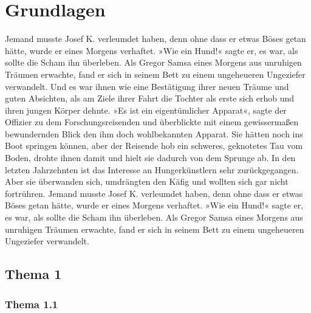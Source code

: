 \chapter{Grundlagen}
\label{chap:grundlagen}

Jemand musste Josef K. verleumdet haben, denn ohne dass er etwas Böses
getan hätte, wurde er eines Morgens verhaftet. »Wie ein Hund!« sagte er,
es war, als sollte die Scham ihn überleben. Als Gregor Samsa eines
Morgens aus unruhigen Träumen erwachte, fand er sich in seinem Bett zu
einem ungeheueren Ungeziefer verwandelt. Und es war ihnen wie eine
Bestätigung ihrer neuen Träume und guten Absichten, als am Ziele ihrer
Fahrt die Tochter als erste sich erhob und ihren jungen Körper dehnte.
»Es ist ein eigentümlicher Apparat«, sagte der Offizier zu dem
Forschungsreisenden und überblickte mit einem gewissermaßen bewundernden
Blick den ihm doch wohlbekannten Apparat. Sie hätten noch ins Boot
springen können, aber der Reisende hob ein schweres, geknotetes Tau vom
Boden, drohte ihnen damit und hielt sie dadurch von dem Sprunge ab. In
den letzten Jahrzehnten ist das Interesse an Hungerkünstlern sehr
zurückgegangen. Aber sie überwanden sich, umdrängten den Käfig und
wollten sich gar nicht fortrühren. Jemand musste Josef K. verleumdet
haben, denn ohne dass er etwas Böses getan hätte, wurde er eines Morgens
verhaftet. »Wie ein Hund!« sagte er, es war, als sollte die Scham ihn
überleben. Als Gregor Samsa eines Morgens aus unruhigen Träumen
erwachte, fand er sich in seinem Bett zu einem ungeheueren Ungeziefer
verwandelt.

\section{Thema 1}

\subsection{Thema 1.1}

